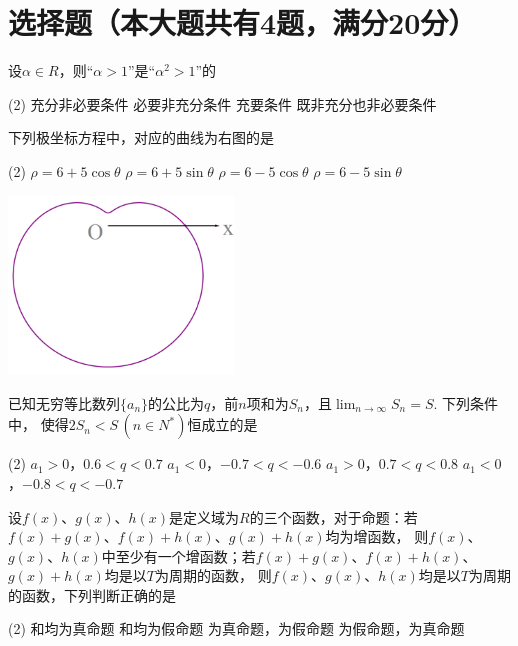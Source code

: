 \documentclass[12pt,space]{ctexart} %
\begin{document}
\section{选择题（本大题共有4题，满分20分）}
\begin{enumerate}[itemsep=-0.3em,topsep=0pt, resume]

  \item 设$\alpha\in R$，则“$\alpha>1$”是“$\alpha^2>1$”的
  \begin{tasks}(2)
    \task 充分非必要条件 \task 必要非充分条件 \task 充要条件 \task 既非充分也非必要条件
  \end{tasks}\vspace{1em}
  
  \begin{minipage}[h][5em][t]{.6\textwidth}
    \item 下列极坐标方程中，对应的曲线为右图的是
    \begin{tasks}(2)
      \task $\rho=6+5\cos\theta$ \task $\rho=6+5\sin\theta$ \task $\rho=6-5\cos\theta$ \task $\rho=6-5\sin\theta$
    \end{tasks}
  \end{minipage}
  \begin{minipage}[h][4em][b]{.3\textwidth}
    \centering\includegraphics[width=0.45\textwidth]{Image/sh-16.png}
  \end{minipage}

  \item 已知无穷等比数列$\{a_n\}$的公比为$q$，前$n$项和为$S_n$，且$\displaystyle{\lim_{n\rightarrow\infty}S_n=S}$. 下列条件中，
        使得$2S_n<S\,(n\in N^*)$恒成立的是
  \begin{tasks}(2)
    \task $a_1>0$，$0.6<q<0.7$ \task $a_1<0$，$-0.7<q<-0.6$ 
    \task $a_1>0$，$0.7<q<0.8$ \task $a_1<0$，$-0.8<q<-0.7$ 
  \end{tasks}

  \item 设$f(x)$、$g(x)$、$h(x)$是定义域为$R$的三个函数，对于命题：若$f(x)+g(x)$、$f(x)+h(x)$、$g(x)+h(x)$均为增函数，
        则$f(x)$、$g(x)$、$h(x)$中至少有一个增函数；若$f(x)+g(x)$、$f(x)+h(x)$、$g(x)+h(x)$均是以$T$为周期的函数，
        则$f(x)$、$g(x)$、$h(x)$均是以$T$为周期的函数，下列判断正确的是
  \begin{tasks}(2)
    \task {}和均为真命题 \task {}和均为假命题
    \task {}为真命题，为假命题 \task {}为假命题，为真命题
  \end{tasks}

\end{enumerate}
\end{document}
